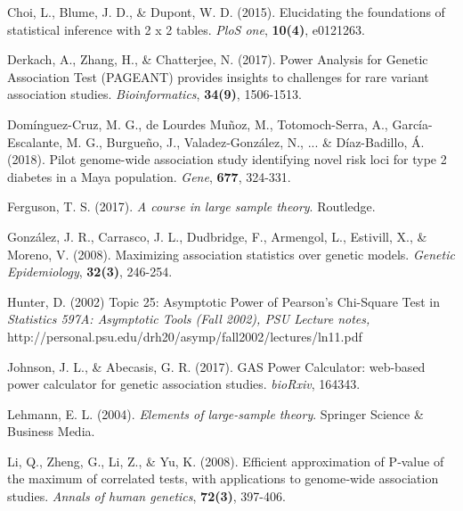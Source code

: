 \documentclass[11pt]{article}
\theoremstyle{definition}
\begin{document}
\begin{thebibliography}{}

\normalsize{
Choi, L., Blume, J. D., \& Dupont, W. D. (2015). 
Elucidating the foundations of statistical inference with 2 x 2 tables. 
{\it PloS one}, {\bf 10(4)}, e0121263.

Derkach, A., Zhang, H., \& Chatterjee, N. (2017). 
Power Analysis for Genetic Association Test (PAGEANT) provides insights to challenges for rare variant association studies. 
{\it Bioinformatics}, {\bf 34(9)}, 1506-1513.

Dom\'inguez-Cruz, M. G., de Lourdes Mu\~noz, M., Totomoch-Serra, A., Garc\'ia-Escalante, M. G., Burgue\~no, J., Valadez-Gonz\'alez, N., ... \& D\'iaz-Badillo, \'A. (2018). 
Pilot genome-wide association study identifying novel risk loci for type 2 diabetes in a Maya population. 
{\it Gene}, {\bf 677}, 324-331.

Ferguson, T. S. (2017). {\it A course in large sample theory}. Routledge.

Gonz\'{a}lez, J. R., Carrasco, J. L., Dudbridge, F., Armengol, L., Estivill, X., \& Moreno, V. (2008). 
Maximizing association statistics over genetic models. 
{\it Genetic Epidemiology}, {\bf 32(3)}, 246-254.

Hunter, D. (2002) Topic 25: Asymptotic Power of Pearson’s Chi-Square Test in 
{\it Statistics 597A: Asymptotic Tools (Fall 2002), PSU Lecture notes,} http://personal.psu.edu/drh20/asymp/fall2002/lectures/ln11.pdf

Johnson, J. L., \& Abecasis, G. R. (2017). 
GAS Power Calculator: web-based power calculator for genetic association studies. 
{\it bioRxiv}, 164343.

Lehmann, E. L. (2004). {\it Elements of large-sample theory}. Springer Science \& Business Media.

Li, Q., Zheng, G., Li, Z., \& Yu, K. (2008). 
Efficient approximation of P‐value of the maximum of correlated tests, with applications to genome‐wide association studies. 
{\it Annals of human genetics}, {\bf 72(3)}, 397-406.

}
\end{thebibliography}
\end{document}
